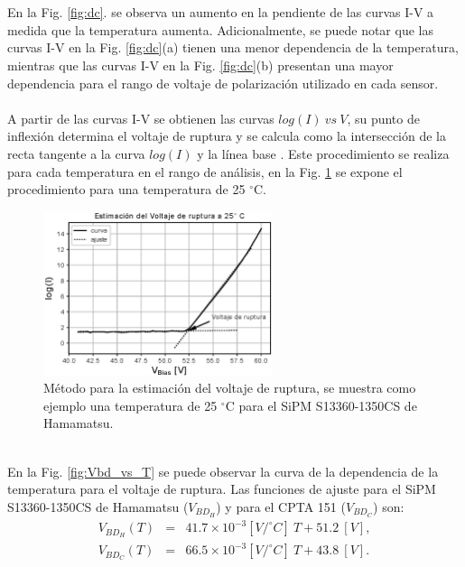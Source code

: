 \\ \\
En la Fig. \ref{fig:dc}. se observa un aumento en la pendiente de las curvas I-V a medida que la temperatura aumenta. Adicionalmente, se puede notar que las curvas I-V en la Fig. \ref{fig:dc}(a) tienen una menor dependencia de la temperatura, mientras que las curvas I-V en la Fig. \ref{fig:dc}(b) presentan una mayor dependencia para el rango de voltaje de polarización utilizado en cada sensor.
\\ \\
A partir de las curvas I-V se obtienen las curvas $log(I)~vs~V$, su punto de inflexión determina el voltaje de ruptura y se calcula como la intersección de la recta tangente a la curva  $log(I)$ y la línea base \citep{MPPC_note, Ruptura_metodo}. Este procedimiento se realiza para cada temperatura en el rango de análisis, en la Fig. \ref{fig:ruptura} se expone el procedimiento para una temperatura de 25 $^\circ$C.
\begin{figure}[h!]
\begin{centering}
  \includegraphics[width=0.6\textwidth]{Images/cal_voltaje_ruptura.eps}
  \caption{Método para la estimación del voltaje de ruptura, se muestra como ejemplo una temperatura de 25 $^\circ$C para el SiPM S13360-1350CS de Hamamatsu.}
  \label{fig:ruptura}
  \par\end{centering}
\end{figure}
\\
En la Fig. \ref{fig:Vbd_vs_T} se puede observar la curva de la dependencia de la temperatura para el voltaje de ruptura. Las funciones de ajuste para el SiPM S13360-1350CS de Hamamatsu ($V_{BD_{H}}$) y para el CPTA 151 ($V_{BD_{C}}$) son:
\begin{eqnarray}
V_{BD_{H}}(T) &=& 41.7\times10^{-3}[V/^\circ C]~T + 51.2~[V],\\
V_{BD_{C}}(T) &=& 66.5\times10^{-3}[V/^\circ C]~T+ 43.8~[V].
\end{eqnarray}

